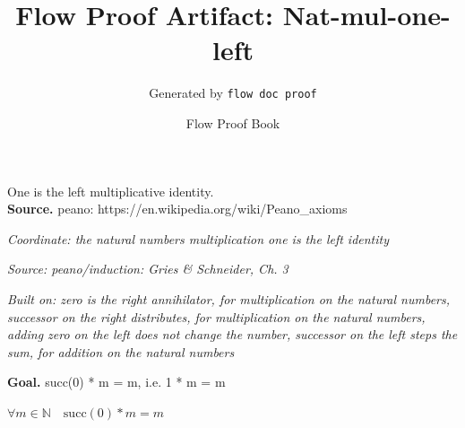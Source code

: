 \documentclass[11pt]{article}
\title{Flow Proof Artifact: Nat-mul-one-left}
\author{Generated by \texttt{flow doc proof}}
\date{Flow Proof Book}
\theoremstyle{definition}
\begin{document}
\maketitle
One is the left multiplicative identity.\\[0.5em]
\textbf{Source.} peano: https://en.wikipedia.org/wiki/Peano\_axioms\\[0.5em]
\bigskip
{}\par
\smallskip\noindent\textit{Coordinate: the natural numbers \cdot multiplication \cdot one is the left identity}\par
\smallskip\noindent\textit{Source: peano/induction: Gries \& Schneider, Ch. 3}\par
\smallskip\noindent\textit{Built on: zero is the right annihilator, for multiplication on the natural numbers, successor on the right distributes, for multiplication on the natural numbers, adding zero on the left does not change the number, successor on the left steps the sum, for addition on the natural numbers}\par
\medskip
\noindent\textbf{Goal.} succ(0) * m = m, i.e. 1 * m = m\par
\noindent$\displaystyle \forall m \in \mathbb{N}\quad \mathrm{succ}(0) * m = m$\par
\medskip
\noindent
\end{document}
